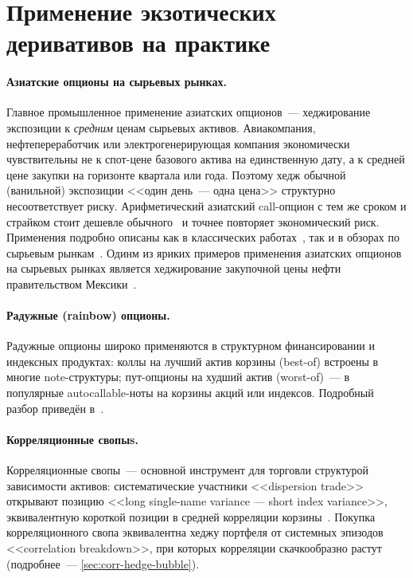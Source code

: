 \section{Применение экзотических деривативов на практике}
\label{sec:exotic-practice}

\paragraph{Азиатские опционы на сырьевых рынках.}
Главное промышленное применение азиатских опционов~--- хеджирование
экспозиции к \emph{средним} ценам сырьевых активов. Авиакомпания,
нефтепереработчик или электрогенерирующая компания экономически
чувствительны не к спот-цене базового актива на единственную дату, а к
средней цене закупки на горизонте квартала или года. Поэтому хедж
обычной (ванильной) экспозиции <<один день~--- одна цена>> структурно
несоответствует риску. Арифметический азиатский call-опцион с тем же
сроком и страйком стоит дешевле обычного~\cite{kemna1990pricing} и
точнее повторяет экономический риск. Применения подробно описаны как в
классических работах~\cite{kemna1990pricing, vorst1992prices}, так и в
обзорах по сырьевым рынкам~\cite{leoni2014commodity, geman2005commodities}.
Одинм из яриких примеров применения азиатских опционов на сырьевых рынках
является хеджирование закупочной цены нефти правительством Мексики~\cite{MaValencia2018}.

\paragraph{Радужные (rainbow) опционы.}
Радужные опционы широко применяются в структурном финансировании и
индексных продуктах: коллы на лучший актив корзины (best-of) встроены в
многие note-структуры; пут-опционы на худший актив (worst-of)~--- в
популярные autocallable-ноты на корзины акций или индексов. Подробный
разбор приведён в~\cite{wilmott2006pwif}.

\paragraph{Корреляционные свопыs.}
Корреляционные свопы~--- основной инструмент для торговли структурой
зависимости активов: систематические участники <<dispersion trade>>
открывают позицию <<long single-name variance --- short index
variance>>, эквивалентную короткой позиции в средней корреляции
корзины~\cite{bossu2014correlation}. Покупка корреляционного свопа
эквивалентна хеджу портфеля от системных эпизодов
<<correlation breakdown>>, при которых корреляции скачкообразно растут
(подробнее~--- \cref{sec:corr-hedge-bubble}).

